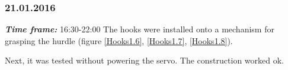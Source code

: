 \subsubsection{21.01.2016}
\textit{\textbf{Time frame:}} 16:30-22:00 \newline
The hooks were installed onto a mechanism for grasping the hurdle (figure \ref{Hooks1.6}, \ref{Hooks1.7}, \ref{Hooks1.8}). 

Next, it was tested without powering the servo. The construction worked ok.

\begin{figure}[H]
	\begin{minipage}[h]{0.27\linewidth}

\end{minipage}
\end{figure}
